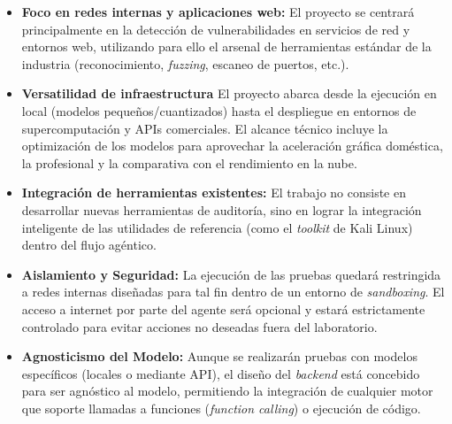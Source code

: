 \begin{itemize}
    \item \textbf{Foco en redes internas y aplicaciones web:} El proyecto se centrará principalmente en la detección de vulnerabilidades en servicios de red y entornos web, utilizando para ello el arsenal de herramientas estándar de la industria (reconocimiento, \textit{fuzzing}, escaneo de puertos, etc.).
    
    \item \textbf{Versatilidad de infraestructura} El proyecto abarca desde la ejecución en local (modelos pequeños/cuantizados) hasta el despliegue en entornos de supercomputación y APIs comerciales. El alcance técnico incluye la optimización de los modelos para aprovechar la aceleración gráfica doméstica, la profesional y la comparativa con el rendimiento en la nube.
    
    \item \textbf{Integración de herramientas existentes:} El trabajo no consiste en desarrollar nuevas herramientas de auditoría, sino en lograr la integración inteligente de las utilidades de referencia (como el \textit{toolkit} de Kali Linux) dentro del flujo agéntico.
    
    \item \textbf{Aislamiento y Seguridad:} La ejecución de las pruebas quedará restringida a redes internas diseñadas para tal fin dentro de un entorno de \textit{sandboxing}. El acceso a internet por parte del agente será opcional y estará estrictamente controlado para evitar acciones no deseadas fuera del laboratorio.
    
    \item \textbf{Agnosticismo del Modelo:} Aunque se realizarán pruebas con modelos específicos (locales o mediante API), el diseño del \textit{backend} está concebido para ser agnóstico al modelo, permitiendo la integración de cualquier motor que soporte llamadas a funciones (\textit{function calling}) o ejecución de código.
\end{itemize}